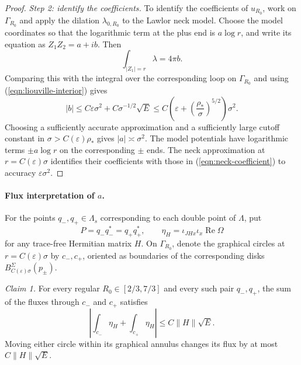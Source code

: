 \documentclass[11pt,a4paper]{article}
\numberwithin{equation}{section}
\theoremstyle{definition}
\theoremstyle{remark}
\newcommand{\Ree}{\operatorname{Re}}
\begin{document}
\begin{proof}
		\smallskip
		\noindent\emph{Step 2: identify the coefficients.}
		To identify the coefficients of $u_{R_0}$, work on $\Gamma_{R_0}$
		and apply the dilation $\lambda_{0,R_0}$ to the Lawlor neck model.
		Choose the model coordinates so that the logarithmic term at the plus end
		is $a\log r$, and write its equation as $Z_1Z_2=a+ib$. Then
		\[
		\int_{|Z_1|=r}\lambda=4\pi b.
		\]
		Comparing this with the integral over the corresponding loop on
		$\Gamma_{R_0}$ and using
		(\ref{eqn:liouville-interior}) gives
		\[
		|b|\le C\varepsilon\sigma^2+C\sigma^{-1/2}\sqrt E
		\le C\left(\varepsilon+
		\left(\frac{\rho_*}{\sigma}\right)^{5/2}\right)\sigma^2.
		\]
		Choosing a sufficiently accurate approximation and a sufficiently large
		cutoff constant in $\sigma>C(\varepsilon)\rho_*$ gives $|a|\asymp\sigma^2$.
		The model potentials have logarithmic terms $\pm a\log r$
		on the corresponding $\pm$ ends. The neck approximation at $r=C(\varepsilon)\sigma$
		identifies their coefficients with those in
		(\ref{eqn:neck-coefficient}) to accuracy $\varepsilon\sigma^2$.
	\end{proof}
	
	\paragraph{Flux interpretation of $a$.}
	For the points $q_-,q_+\in\Lambda_s$ corresponding to each double point
	of $\Lambda$, put
	\[
	P=q_-q_-^*=q_+q_+^*,\qquad
	\eta_H=\iota_{JHx}\iota_x\Ree\Omega
	\]
	for any trace-free Hermitian matrix $H$.
	On $\Gamma_{R_0}$, denote the graphical circles at $r=C(\varepsilon)\sigma$ by
	$c_-,c_+$, oriented as boundaries of the corresponding disks
	$B_{C(\varepsilon)\sigma}^{\Sigma}(p_\pm)$.
	
	\smallskip
	\noindent\emph{Claim 1.} For every regular $R_0\in[2/3,7/3]$ and every
	such pair $q_-,q_+$, the sum of the fluxes through $c_-$ and $c_+$ satisfies
	\begin{equation}\label{eqn:paired-boundary-flux}
		\left|\int_{c_-}\eta_H+\int_{c_+}\eta_H\right|
		\le C\|H\|\sqrt E.
	\end{equation}
	Moving either circle within its graphical annulus changes its flux
	by at most $C\|H\|\sqrt E$.
	
\end{document}
